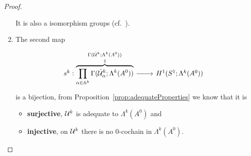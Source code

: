 \begin{proof}
\begin{enumerate}
    It is also a isomorphism groups (cf.~\cite{Loday1994}).
    \begin{comment}
      Problems:
      \begin{itemize}
      \item Show that a element of $\Lambda_\alpha^k(A^0)$ is extensionable
        to the arc $U_\alpha\in\dot\cU_\alpha^k$ if and only if it has
        maximal decay in direction $\alpha$.
      \item \PROBLEM[$\Sto_\alpha^k(A^0)\subsetneq\Lambda_\alpha^k(A^0)$]
        and thus
        \[
        i^k:
        \underset{\alpha\in\A}\prod\Sto_\alpha^k(A^0)
        \subsetneq
        \underset{\alpha\in\A}\prod\Lambda_\alpha^k(A^0)
        \to
        \prod_{\alpha\in\A^k}\Gamma(\dot\cU_\alpha^k;\Lambda^k(A^0))
        \]
      \end{itemize}
      Facts:
      \begin{itemize}
      \item Every arc $U\in\dot\cU_\alpha^k$ has the width $\frac{\pi}{k}$
        and is delimited by Stokes directions, i.e.\ is $U_\alpha^k$ the largest
        arc, to contain no \textbf{corresponding} Stokes ray
        \begin{einr}
          Then might \cite[Lemma 1]{BJL1979Birkhoff} on page 72-73 help? \textbf{NO!}
        \end{einr}
      \end{itemize}
      IDEAS:
      \begin{itemize}
      \item See \cite[375]{Martinet1991} and
        \textbf{\cite[Def.5 on 372]{Martinet1991}}
      \item \textbf{See \cite{babbitt1989local}} and
        \textbf{\textcolor{green!60!black}{\cite[72]{babbitt1989local}}}
      \item or maybe \cite{wasow2002asymptotic}
      \end{itemize}
    \end{comment}
  \item The second map
    \[ \begin{tikzcd}
      s^k:
      \overset{\Gamma(\dot\cU^k;\Lambda^k(A^0))}{%
        \overset{\text{\rotatebox[origin=c]{-90}{$=$}}}{%
          \overbrace{%
            \prod_{\alpha\in\A^k}\Gamma(\dot\cU_\alpha^k;\Lambda^k(A^0))}}}
      \rar &
      H^1(S^1;\Lambda^k(A^0))
    \end{tikzcd} \]
    is a bijection,  from
    Proposition~\ref{prop:adequateProperties} we know that it is
    \begin{itemize}
    \item \textbf{surjective},  $\mathcal{U}^k$ is adequate to
      $\Lambda^k(A^0)$ and
    \item \textbf{injective},  on $\mathcal{U}^k$ there is no
      $0$-cochain in $\Lambda^k(A^0)$.
    \end{itemize}
  \end{enumerate}
  \PROBLEM[Naturality?]
\end{proof}

